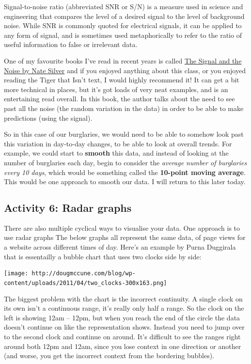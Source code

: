 \documentclass[]{book}
\theoremstyle{definition}
\theoremstyle{definition}
\theoremstyle{definition}
\theoremstyle{remark}
\begin{document}
Signal-to-noise ratio (abbreviated SNR or S/N) is a measure used in
science and engineering that compares the level of a desired signal to
the level of background noise. While SNR is commonly quoted for
electrical signals, it can be applied to any form of signal, and is
sometimes used metaphorically to refer to the ratio of useful
information to false or irrelevant data.

One of my favourite books I've read in recent years is called
\href{https://www.theguardian.com/books/2012/nov/09/signal-and-noise-nate-silver-review}{The
Signal and the Noise by Nate Silver} and if you enjoyed anything about
this class, or you enjoyed reading the Tiger that Isn't text, I would
highly recommend it! It can get a bit more technical in places, but it's
got loads of very neat examples, and is an entertaining read overall. In
this book, the author talks about the need to see past all the noise
(the random variation in the data) in order to be able to make
predictions (using the signal).

So in this case of our burglaries, we would need to be able to somehow
look past this variation in day-to-day changes, to be able to look at
overall trends. For example, we could start to \textbf{smooth} this
data, and instead of looking at the number of burglaries each day, begin
to consider the \emph{average number of burglaries every 10 days}, which
would be something called the \textbf{10-point moving average}. This
would be one approach to smooth our data. I will return to this later
today.

\hypertarget{activity-6-radar-graphs}{%
\subsection{Activity 6: Radar graphs}\label{activity-6-radar-graphs}}

There are also multiple cyclical ways to visualise your data. One
approach is to use radar graphs The below graphs all represent the same
data, of page views for a website across different times of day. Here's
an example by Purna Duggirala that is essentailly a bubble chart that
uses two clocks side by side:

\texttt{[image: http://dougmccune.com/blog/wp-content/uploads/2011/04/two\_clocks-300x163.png]}

The biggest problem with the chart is the incorrect continuity. A single
clock on its own isn't a continuous range, it's really only half a
range. So the clock on the left is showing 12am -- 12pm, but when you
reach the end of the circle the data doesn't continue on like the
representation shows. Instead you need to jump over to the second clock
and continue on around. It's difficult to see the ranges right around
both 12pm and 12am, since you lose context in one direction or another
(and worse, you get the incorrect context from the bordering bubbles).
\end{document}
